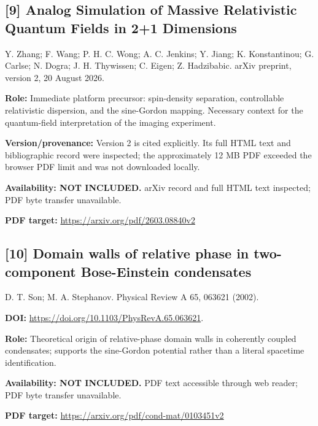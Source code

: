 \documentclass[11pt,a4paper]{article}
\begin{document}
\begin{minipage}{\textwidth}
\subsection*{[9] Analog Simulation of Massive Relativistic Quantum Fields in 2+1 Dimensions}
Y. Zhang; F. Wang; P. H. C. Wong; A. C. Jenkins; Y. Jiang; K. Konstantinou; G. Carlse; N. Dogra; J. H. Thywissen; C. Eigen; Z. Hadzibabic. arXiv preprint, version 2, 20 August 2026.

\textbf{Role:} Immediate platform precursor: spin-density separation, controllable relativistic dispersion, and the sine-Gordon mapping. Necessary context for the quantum-field interpretation of the imaging experiment.

\textbf{Version/provenance:} Version 2 is cited explicitly. Its full HTML text and bibliographic record were inspected; the approximately 12 MB PDF exceeded the browser PDF limit and was not downloaded locally.

\textbf{Availability: NOT INCLUDED.} arXiv record and full HTML text inspected; PDF byte transfer unavailable.\par
\textbf{PDF target:} \url{https://arxiv.org/pdf/2603.08840v2}
\end{minipage}
\par\medskip
\begin{minipage}{\textwidth}
\subsection*{[10] Domain walls of relative phase in two-component Bose-Einstein condensates}
D. T. Son; M. A. Stephanov. Physical Review A 65, 063621 (2002).

\textbf{DOI:} \url{https://doi.org/10.1103/PhysRevA.65.063621}.

\textbf{Role:} Theoretical origin of relative-phase domain walls in coherently coupled condensates; supports the sine-Gordon potential rather than a literal spacetime identification.

\textbf{Availability: NOT INCLUDED.} PDF text accessible through web reader; PDF byte transfer unavailable.\par
\textbf{PDF target:} \url{https://arxiv.org/pdf/cond-mat/0103451v2}
\end{minipage}
\par\medskip
\end{document}

